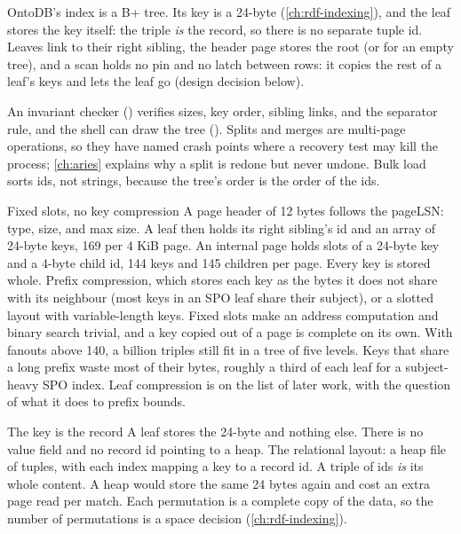 \begin{ontodb}
OntoDB's index is a B+ tree. Its key is a 24-byte 
(\cref{ch:rdf-indexing}), and the leaf stores the key itself: the triple
\emph{is} the record, so there is no separate tuple id. Leaves link to their
right sibling, the header page stores the root (or  for
an empty tree), and a scan holds no pin and no latch between rows: it copies
the rest of a leaf's keys and lets the leaf go (design decision below).

An invariant checker () verifies sizes, key order, sibling
links, and the separator rule, and the shell can draw the tree
(). Splits and merges are multi-page
operations, so they have named crash points where a recovery test may kill the
process; \cref{ch:aries} explains why a split is redone but never undone.
Bulk load sorts ids, not strings, because the tree's order is the order of the
ids.
\end{ontodb}

\begin{decision}{Fixed slots, no key compression}
 A page header of 12 bytes follows the pageLSN: type, size, and
max size. A leaf then holds its right sibling's id and an array of 24-byte keys,
169 per 4 KiB page. An internal page holds slots of a 24-byte key and a 4-byte
child id, 144 keys and 145 children per page. Every key is stored whole.
 Prefix compression, which stores each key as the bytes it
does not share with its neighbour (most keys in an SPO leaf share their subject),
or a slotted layout with variable-length keys.
 Fixed slots make  an address computation and binary
search trivial, and a key copied out of a page is complete on its own. With
fanouts above 140, a billion triples still fit in a tree of five levels.
 Keys that share a long prefix waste most of their bytes, roughly
a third of each leaf for a subject-heavy SPO index. Leaf compression is on the
list of later work, with the question of what it does to prefix bounds.
\end{decision}

\begin{decision}{The key is the record}
 A leaf stores the 24-byte  and nothing else.
There is no value field and no record id pointing to a heap.
 The relational layout: a heap file of tuples, with each
index mapping a key to a record id.
 A triple of ids \emph{is} its whole content. A heap would store the
same 24 bytes again and cost an extra page read per match.
 Each permutation is a complete copy of the data, so the number of
permutations is a space decision (\cref{ch:rdf-indexing}).
\end{decision}

